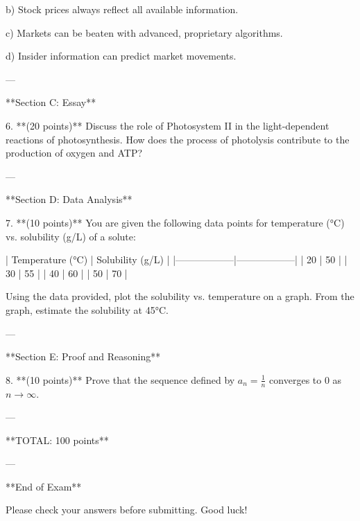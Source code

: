 \documentclass{article}
\begin{document}
    b) Stock prices always reflect all available information.
    
    c) Markets can be beaten with advanced, proprietary algorithms.
    
    d) Insider information can predict market movements.

---

**Section C: Essay**

6. **(20 points)** Discuss the role of Photosystem II in the light-dependent reactions of photosynthesis. How does the process of photolysis contribute to the production of oxygen and ATP?

---

**Section D: Data Analysis**

7. **(10 points)** You are given the following data points for temperature (°C) vs. solubility (g/L) of a solute: 

| Temperature (°C) | Solubility (g/L) |
|------------------|------------------|
| 20               | 50               |
| 30               | 55               |
| 40               | 60               |
| 50               | 70               |

Using the data provided, plot the solubility vs. temperature on a graph. From the graph, estimate the solubility at 45°C.

---

**Section E: Proof and Reasoning**

8. **(10 points)** Prove that the sequence defined by \(a_n = \frac{1}{n}\) converges to 0 as \(n \to \infty\).

---

**TOTAL: 100 points**

---

**End of Exam**

Please check your answers before submitting. Good luck!
\end{document}
